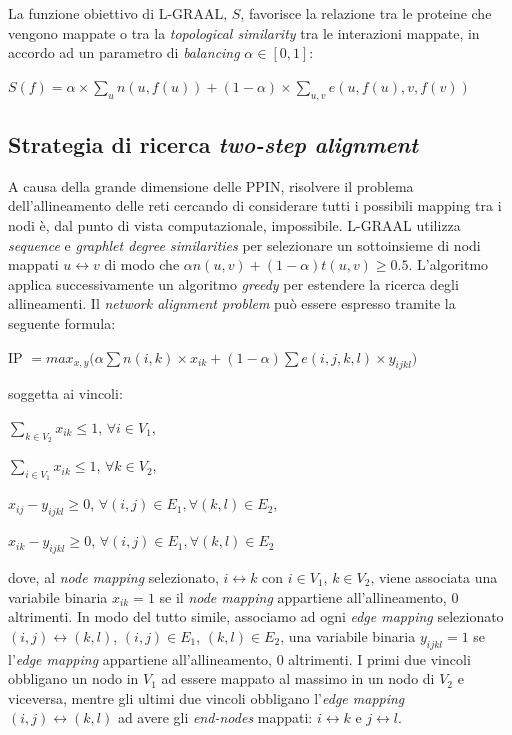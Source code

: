 \documentclass[11pt]{article}
\begin{document}
La funzione obiettivo di L-GRAAL, $S$, favorisce la relazione tra le proteine che vengono mappate o tra la \textit{topological similarity} tra le interazioni mappate, in accordo ad un parametro di \textit{balancing} $\alpha \in [0,1]$:
\begin{center}
$S(f) = \alpha \times \displaystyle{\sum_{u}n(u,f(u)) + (1- \alpha) \times \sum_{u,v}e(u,f(u),v,f(v))}$
\end{center}

\subsection{Strategia di ricerca \textit{two-step alignment}}
A causa della grande dimensione delle PPIN, risolvere il problema dell'allineamento delle reti cercando di considerare tutti i possibili mapping tra i nodi è, dal punto di vista computazionale, impossibile. L-GRAAL utilizza \textit{sequence} e \textit{graphlet degree similarities} per selezionare un sottoinsieme di nodi mappati $u \longleftrightarrow v$ di modo che $\alpha n(u,v) + (1-\alpha)t(u,v) \geq 0.5$. L'algoritmo applica successivamente un algoritmo \textit{greedy} per estendere la ricerca degli allineamenti. Il \textit{network alignment problem} può essere espresso tramite la seguente formula:

\begin{center}
IP $= max_{x,y} \displaystyle{\Big( \alpha \sum n(i,k) \times x_{ik} + (1- \alpha) \sum e(i,j,k,l) \times y_{ijkl}} \Big)$
\end{center}
soggetta ai vincoli:
\begin{center}
$\displaystyle{\sum_{k \in V_2}x_{ik} \leq 1}$, $\forall i \in V_1$,

$\displaystyle{\sum_{i \in V_1}x_{ik} \leq 1}$, $\forall k \in V_2$,

$x_{ij} - y_{ijkl} \geq 0$, $\forall (i,j) \in E_1, \forall (k,l) \in E_2$,

$x_{ik} - y_{ijkl} \geq 0$, $\forall (i,j) \in E_1, \forall (k,l) \in E_2$
\end{center}

dove, al \textit{node mapping} selezionato, $i \longleftrightarrow k$ con $i \in V_1$, $k \in V_2$, viene associata una variabile binaria $x_{ik} = 1$ se il \textit{node mapping} appartiene all'allineamento, 0 altrimenti. In modo del tutto simile, associamo ad ogni \textit{edge mapping} selezionato $(i,j) \longleftrightarrow (k,l)$, $(i,j) \in E_1$, $(k,l) \in E_2$, una variabile binaria $y_{ijkl} = 1$ se l'\textit{edge mapping} appartiene all'allineamento, 0 altrimenti. I primi due vincoli obbligano un nodo in $V_1$ ad essere mappato al massimo in un nodo di $V_2$ e viceversa, mentre gli ultimi due vincoli obbligano l'\textit{edge mapping} $(i,j) \longleftrightarrow (k,l)$ ad avere gli \textit{end-nodes} mappati: $i \longleftrightarrow k$ e $j \longleftrightarrow l$.
\end{document}
